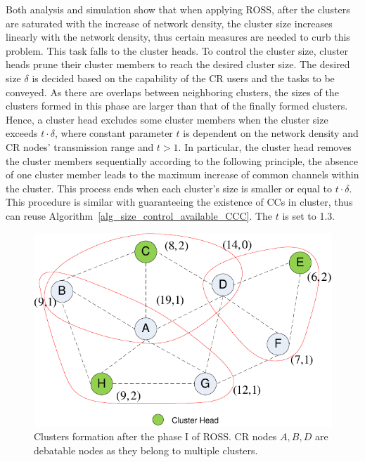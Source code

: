 \documentclass[times]{ettauth}
\theoremstyle{mytheoremstyle}
\theoremstyle{mytheoremstyle}
\theoremstyle{mytheoremstyle}
\begin{document}
Both analysis and simulation show that when applying ROSS, after the clusters are saturated with the increase of network density, the cluster size increases linearly with the network density, thus certain measures are needed to curb this problem.
This task falls to the cluster heads.
To control the cluster size, cluster heads prune their cluster members to reach the desired cluster size.
The desired size $\delta$ is decided based on the capability of the CR users and the tasks to be conveyed.
As there are overlaps between neighboring clusters, the sizes of the clusters formed in this phase are larger than that of the finally formed clusters.
Hence, a cluster head excludes some cluster members when the cluster size exceeds $t\cdot \delta$, where constant parameter $t$ is dependent on the network density and CR nodes' transmission range and $t>1$.
In particular, the cluster head removes the cluster members sequentially according to the following principle, the absence of one cluster member leads to the maximum increase of common channels within the cluster.
This process ends when each cluster's size is smaller or equal to $t \cdot\delta$.
This procedure is similar with guaranteeing the existence of CCs in cluster, thus can reuse Algorithm~\ref{alg_size_control_available_CCC}.
The $t$ is set to 1.3. 	


\begin{figure}[ht!]
  \centering
  \includegraphics[width=0.5\linewidth]{figure2.pdf}
  \caption{Clusters formation after the phase I of ROSS. CR nodes $A, B, D$ are debatable nodes as they belong to multiple clusters.}
  \label{fig2}
\end{figure}
\end{document}
